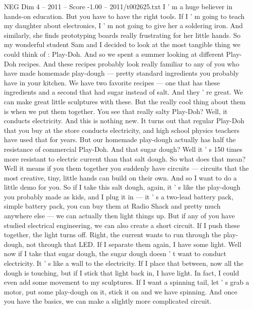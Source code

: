 \begin{textsample}{NEG Dim 4 – 2011 – Score -1.00 – 2011/t002625.txt}  \label{ex:f4_neg_009}
I ' m a huge believer in hands-on education.
But you have to have the right tools.
If I ' m going to teach my daughter about electronics, I ' m not going to give her a soldering iron.
And similarly, she finds prototyping boards really frustrating for her little hands.
So my wonderful student Sam and I decided to look at the most tangible thing we could think of : Play-Doh.
And so we spent a summer looking at different Play-Doh recipes.
And these recipes probably look really familiar to any of you who have made homemade play-dough — pretty standard ingredients you probably have in your kitchen.
We have two favorite recipes — one that has these ingredients and a second that had sugar instead of salt.
And they ' re great.
We can make great little sculptures with these.
But the really cool thing about them is when we put them together.
You see that really salty Play-Doh?
Well, it conducts electricity.
And this is nothing new.
It turns out that regular Play-Doh that you buy at the store conducts electricity, and high school physics teachers have used that for years.
But our homemade play-dough actually has half the resistance of commercial Play-Doh.
And that sugar dough?
Well it ' s 150 times more resistant to electric current than that salt dough.
So what does that mean?
Well it means if you them together you suddenly have circuits — circuits that the most creative, tiny, little hands can build on their own.
And so I want to do a little demo for you.
So if I take this salt dough, again, it ' s like the play-dough you probably made as kids, and I plug it in — it ' s a two-lead battery pack, simple battery pack, you can buy them at Radio Shack and pretty much anywhere else — we can actually then light things up.
But if any of you have studied electrical engineering, we can also create a short circuit.
If I push these together, the light turns off.
Right, the current wants to run through the play-dough, not through that LED.
If I separate them again, I have some light.
Well now if I take that sugar dough, the sugar dough doesn ' t want to conduct electricity.
It ' s like a wall to the electricity.
If I place that between, now all the dough is touching, but if I stick that light back in, I have light.
In fact, I could even add some movement to my sculptures.
If I want a spinning tail, let ' s grab a motor, put some play-dough on it, stick it on and we have spinning.
And once you have the basics, we can make a slightly more complicated circuit.

\end{textsample}
